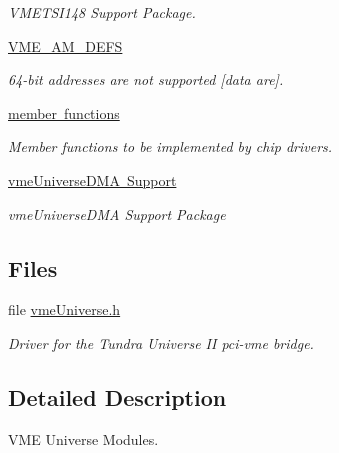 \begin{DoxyCompactItemize}
\begin{DoxyCompactList}\small\item\em V\+M\+E\+T\+S\+I148 Support Package. \end{DoxyCompactList}\item 
\mbox{\hyperlink{group__shared__vmeamdefs}{V\+M\+E\+\_\+\+A\+M\+\_\+\+D\+E\+FS}}
\begin{DoxyCompactList}\small\item\em 64-\/bit {\itshape addresses} are not supported \mbox{[}data are\mbox{]}. \end{DoxyCompactList}\item 
\mbox{\hyperlink{group__shared__bspvmedmalistp}{member functions}}
\begin{DoxyCompactList}\small\item\em Member functions to be implemented by chip drivers. \end{DoxyCompactList}\item 
\mbox{\hyperlink{group__shared__vmeuniversedma}{vme\+Universe\+D\+M\+A Support}}
\begin{DoxyCompactList}\small\item\em vme\+Universe\+D\+MA Support Package \end{DoxyCompactList}\end{DoxyCompactItemize}
\subsection*{Files}
\begin{DoxyCompactItemize}
\item 
file \mbox{\hyperlink{vmeUniverse_8h}{vme\+Universe.\+h}}
\begin{DoxyCompactList}\small\item\em Driver for the Tundra Universe II pci-\/vme bridge. \end{DoxyCompactList}\end{DoxyCompactItemize}


\subsection{Detailed Description}
V\+ME Universe Modules. 


